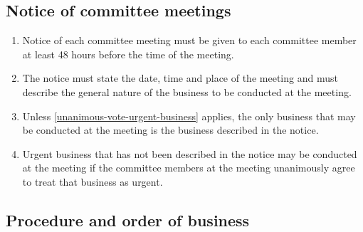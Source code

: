 \documentclass[../constitution.tex]{subfiles}
\begin{document}
\hypertarget{notice-of-committee-meetings}{%
\subsection{Notice of committee meetings}\label{notice-of-committee-meetings}}

\begin{enumerate}

\item Notice of each committee meeting must be given to each committee member at least 48 hours before the time of the meeting.
\item The notice must state the date, time and place of the meeting  and must describe the general nature of the business to be conducted at the meeting.
\item Unless  \ref{unanimous-vote-urgent-business} applies, the only business that may be conducted at the meeting is the business described in the notice.
\item Urgent business that has not been described in the notice may be conducted at the meeting if the committee members at the meeting unanimously agree to treat that business as urgent. \label{unanimous-vote-urgent-business}
\end{enumerate}

\hypertarget{procedure-and-order-of-business}{%
\subsection{Procedure and order of business}\label{procedure-and-order-of-business}}
\end{document}
